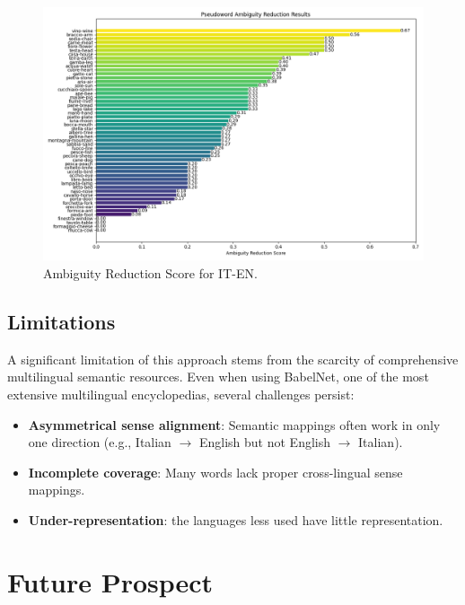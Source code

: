 \documentclass[runningheads]{llncs}
\begin{document}
\begin{figure}[!h]
    \centering
    \includegraphics[scale=0.45]{ambiguity_reduction_plot_IT_EN.png}
    \caption{Ambiguity Reduction Score for IT-EN.}
\end{figure}

\subsection{Limitations}

A significant limitation of this approach stems from the scarcity of comprehensive multilingual semantic resources. Even when using BabelNet, one of the most extensive multilingual encyclopedias, several challenges persist:

\begin{itemize}
\item \textbf{Asymmetrical sense alignment}: Semantic mappings often work in only one direction (e.g., Italian $\rightarrow$ English but not English $\rightarrow$ Italian).
\item \textbf{Incomplete coverage}: Many words lack proper cross-lingual sense mappings.
\item \textbf{Under-representation}: the languages less used have little representation.
\end{itemize}


\section{Future Prospect}



\begin{thebibliography}{8}
\end{thebibliography}
\end{document}

